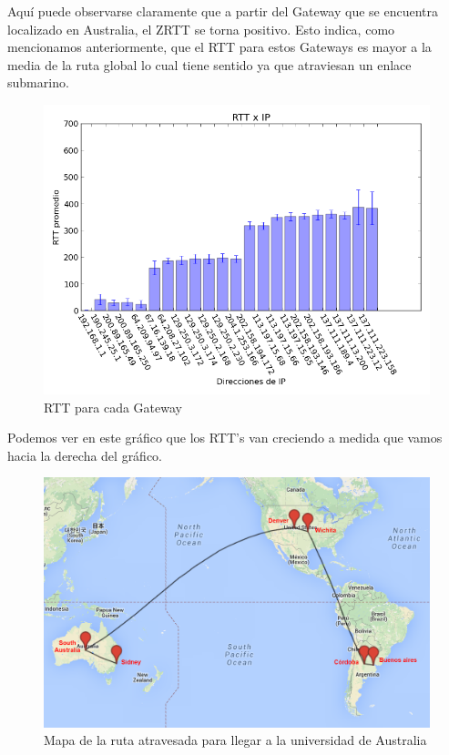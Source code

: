 Aquí puede observarse claramente que a partir del Gateway que se encuentra localizado en Australia, el ZRTT se torna positivo. Esto indica, como mencionamos anteriormente, que el RTT para estos Gateways es mayor a la media de la ruta global lo cual tiene sentido ya que atraviesan un enlace submarino.

\begin{figure}[H]
	\begin{center}
		  \includegraphics[scale=0.5]{../graficos_informe/mq_rtt.png}
		  \caption{RTT para cada Gateway}
		  \label{fig:contra1}
	\end{center}
\end{figure}

Podemos ver en este gráfico que los RTT's van creciendo a medida que vamos hacia la derecha del gráfico.

\begin{figure}[H]
	\begin{center}
		  \includegraphics[scale=0.4]{../mapas/mapa_md.png}
		  \caption{Mapa de la ruta atravesada para llegar a la universidad de Australia}
		  \label{fig:contra1}
	\end{center}
\end{figure}

